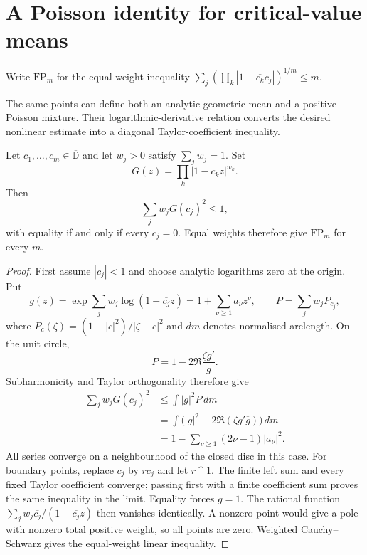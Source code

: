 \documentclass[11pt]{article}
\begin{document}
\section{A Poisson identity for critical-value means}
\label{sec:freepoint}

Write $\mathrm{FP}_m$ for the equal-weight inequality
$\sum_j(\prod_k|1-\overline{c_k}c_j|)^{1/m}\le m$.

The same points can define both an analytic geometric mean and a positive
Poisson mixture.  Their logarithmic-derivative relation converts the desired
nonlinear estimate into a diagonal Taylor-coefficient inequality.

\begin{theorem}
\label{res:fp-weighted-all-degree}
Let $c_1,\ldots,c_m\in\overline{\mathbb D}$ and let $w_j>0$ satisfy
$\sum_j w_j=1$.  Set
\[
 G(z)=\prod_k |1-\overline{c_k}z|^{w_k}.
\]
Then
\[
 \sum_j w_j G(c_j)^2\le 1,
\]
with equality if and only if every $c_j=0$.  Equal weights therefore give
$\mathrm{FP}_m$ for every $m$.
\end{theorem}

\begin{proof}
First assume $|c_j|<1$ and choose analytic logarithms zero at the origin.
Put
\[
 g(z)=\exp\sum_jw_j\log(1-\overline{c_j}z)
      =1+\sum_{\nu\ge1}a_\nu z^\nu,
 \qquad P=\sum_jw_jP_{c_j},
\]
where $P_c(\zeta)=(1-|c|^2)/|\zeta-c|^2$ and $dm$ denotes normalised
arclength.  On the unit circle,
\[
 P=1-2\Re\frac{\zeta g'}g.
\]
Subharmonicity and Taylor orthogonality therefore give
\begin{align*}
 \sum_jw_jG(c_j)^2
 &\le\int |g|^2P\,dm\\
 &=\int\bigl(|g|^2-2\Re(\zeta g'\overline g)\bigr)\,dm\\
 &=1-\sum_{\nu\ge1}(2\nu-1)|a_\nu|^2.
\end{align*}
All series converge on a neighbourhood of the closed disc in this case.
For boundary points, replace $c_j$ by $rc_j$ and let $r\uparrow1$.
The finite left sum and every fixed Taylor coefficient converge; passing
first with a finite coefficient sum proves the same inequality in the limit.
Equality forces $g=1$.  The rational function
$\sum_jw_j\overline{c_j}/(1-\overline{c_j}z)$ then vanishes identically.
A nonzero point would give a pole with nonzero total positive weight, so all
points are zero.  Weighted Cauchy--Schwarz gives the equal-weight linear
inequality.
\end{proof}
\end{document}
